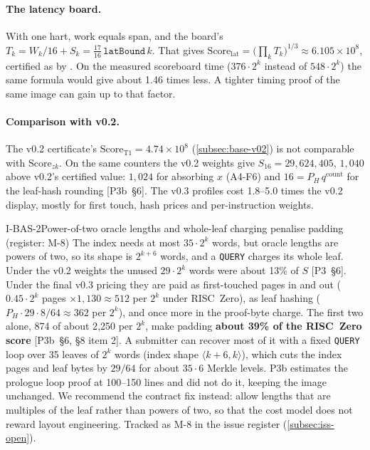 \paragraph{The latency board.} With one hart, work equals span, and the board's
$T_k=W_k/16+S_k=\tfrac{17}{16}\,\mathtt{latBound}\,k$. That gives
$\mathrm{Score}_{\mathrm{lat}}=\bigl(\prod_kT_k\bigr)^{1/3}\approx6.105\times10^8$, certified as
 by . On the measured scoreboard time ($376\cdot2^k$ instead of
$548\cdot2^k$) the same formula would give about 1.46 times less. A tighter timing proof of the same
image can gain up to that factor.

\paragraph{Comparison with v0.2.} The v0.2 certificate's $\mathrm{Score}_{\mathrm{T1}}=4.74\times10^8$
(\cref{subsec:base-v02}) is not comparable with $\mathrm{Score}_{zk}$. On the same counters the v0.2
weights give $S_{16}=29{,}624{,}405$, $1{,}040$ above v0.2's certified value: $1{,}024$ for absorbing
$x$ (A4-F6) and $16=P_H\,q^{\mathrm{count}}$ for the leaf-hash rounding [P3b~§6]. The v0.3 profiles
cost 1.8--5.0 times the v0.2 display, mostly for first touch, hash prices and per-instruction weights.

\begin{issue}{I-BAS-2}{Power-of-two oracle lengths and whole-leaf charging penalise padding (register: M-8)}
The index needs at most $35\cdot2^k$ words, but oracle lengths are powers of two, so its shape is
$2^{k+6}$ words, and a \texttt{QUERY} charges its whole leaf. Under the v0.2 weights the unused
$29\cdot2^k$ words were about 13\% of $S$ [P3~§6]. Under the final v0.3 pricing they are paid as
first-touched pages in and out ($0.45\cdot2^k$ pages $\times1{,}130\approx512$ per $2^k$ under
RISC~Zero), as leaf hashing ($P_H\cdot29\cdot8/64\approx362$ per $2^k$), and once more in the
proof-byte charge. The first two alone, 874 of about 2{,}250 per $2^k$, make padding
\textbf{about 39\% of the RISC~Zero score} [P3b~§6, §8 item 2]. A submitter can recover most of
it with a fixed \texttt{QUERY} loop over 35 leaves of $2^k$ words (index shape $\langle k{+}6,k\rangle$),
which cuts the index pages and leaf bytes by $29/64$ for about $35\cdot6$ Merkle levels. P3b estimates
the prologue loop proof at 100--150 lines and did not do it, keeping the image unchanged. We recommend
the contract fix instead: allow  lengths that are multiples of the leaf rather than
powers of two, so that the cost model does not reward layout engineering. Tracked as M-8 in the issue
register (\cref{subsec:iss-open}).
\end{issue}

